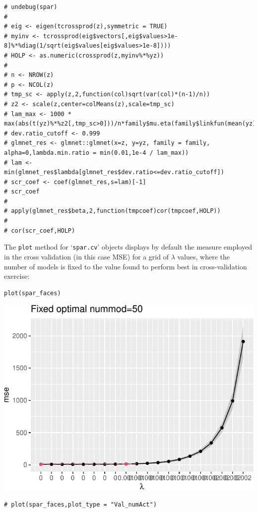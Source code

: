 \documentclass[
  article]{jss}
\begin{document}
\begin{verbatim}
# undebug(spar)
# 
# eig <- eigen(tcrossprod(z),symmetric = TRUE)
# myinv <- tcrossprod(eig$vectors[,eig$values>1e-8]%*%diag(1/sqrt(eig$values[eig$values>1e-8])))
# HOLP <- as.numeric(crossprod(z,myinv%*%yz))
# 
# n <- NROW(z)
# p <- NCOL(z)
# tmp_sc <- apply(z,2,function(col)sqrt(var(col)*(n-1)/n))
# z2 <- scale(z,center=colMeans(z),scale=tmp_sc)
# lam_max <- 1000 * max(abs(t(yz)%*%z2[,tmp_sc>0]))/n*family$mu.eta(family$linkfun(mean(yz)))/family$variance(mean(yz))
# dev.ratio_cutoff <- 0.999
# glmnet_res <- glmnet::glmnet(x=z, y=yz, family = family, alpha=0,lambda.min.ratio = min(0.01,1e-4 / lam_max))
# lam <- min(glmnet_res$lambda[glmnet_res$dev.ratio<=dev.ratio_cutoff])
# scr_coef <- coef(glmnet_res,s=lam)[-1]
# scr_coef
# 
# apply(glmnet_res$beta,2,function(tmpcoef)cor(tmpcoef,HOLP))
# 
# cor(scr_coef,HOLP)
\end{verbatim}

The \texttt{plot} method for `\texttt{spar.cv}' objects displays by
default the measure employed in the cross validation (in this case MSE)
for a grid of \(\lambda\) values, where the number of models is fixed to
the value found to perform best in cross-validation exercise:

\begin{verbatim}
plot(spar_faces)
\end{verbatim}

\includegraphics{SPAR_files/figure-pdf/unnamed-chunk-7-1.pdf}

\begin{verbatim}
# plot(spar_faces,plot_type = "Val_numAct")
\end{verbatim}
\end{document}
